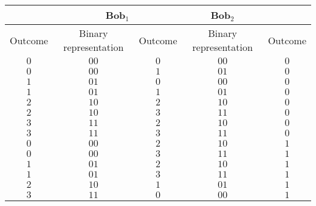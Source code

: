 \documentclass[fleqn,10pt]{wlscirep}
\begin{document}
\begin{table}[h!]
    \centering
    \begin{tabular}{|c|c|c|c|c|}
    \hline
    \rowcolor{lightgray}
       \multicolumn{2}{|c|}{Alice} &\multicolumn{2}{|c|}{Bob$_1$} & Bob$_2$ \\
    \hline
    \rowcolor{lightgray}
      Outcome & Binary representation & Outcome & Binary representation & Outcome \\
    \hline\hline
     $0$ & {\color{blue}$0$}{\color{red}$0$} & $0$ & {\color{blue}$0$}{\color{red}$0$} & {\color{blue}$0$} \\
     \rowcolor{lightgray} $0$ & {\color{blue}$0$}{\color{red}$0$} & $1$ & {\color{blue}$0$}{\color{red}$1$} & {\color{blue}$0$} \\
     $1$ & {\color{blue} $0$}{\color{red}$1$} & $0$ & {\color{blue}$0$}{\color{red}$0$} & {\color{blue}$0$} \\
    \rowcolor{lightgray}  $1$ & {\color{blue} $0$}{\color{red}$1$} & $1$ & {\color{blue}$0$}{\color{red}$1$} & {\color{blue}$0$} \\
     $2$ & {\color{blue}$1$}{\color{red}$0$} & $2$ & {\color{blue}$1$}{\color{red}$0$} & {\color{blue}$0$} \\
    \rowcolor{lightgray}  $2$ & {\color{blue}$1$}{\color{red}$0$} & $3$ & {\color{blue}$1$}{\color{red}$1$} & {\color{blue}$0$} \\
     $3$ & {\color{blue} $1$}{\color{red}$1$} & $2$ & {\color{blue}$1$}{\color{red}$0$} & {\color{blue}$0$} \\
    \rowcolor{lightgray}  $3$ & {\color{blue} $1$}{\color{red}$1$} & $3$ & {\color{blue}$1$}{\color{red}$1$} & {\color{blue}$0$} \\
     \hline
     $0$ & {\color{blue} $0$}{\color{red}$0$} & $2$ & {\color{blue}$1$}{\color{red}$0$} & {\color{blue}$1$} \\
    \rowcolor{lightgray}  $0$ & {\color{blue}$0$}{\color{red}$0$} & $3$ & {\color{blue}$1$}{\color{red}$1$} & {\color{blue}$1$} \\
     $1$ & {\color{blue}$0$}{\color{red}$1$} & $2$ & {\color{blue} $1$}{\color{red}$0$} & {\color{blue}$1$} \\
    \rowcolor{lightgray}  $1$ & {\color{blue}$0$}{\color{red}$1$} & $3$ & {\color{blue}$1$}{\color{red}$1$} & {\color{blue}$1$} \\
     $2$ & {\color{blue} $1$}{\color{red}$0$} & $1$ & {\color{blue}$0$}{\color{red}$1$} & {\color{blue}$1$} \\
    \rowcolor{lightgray}  $3$ & {\color{blue}$1$}{\color{red}$1$} & $0$ & {\color{blue}$0$}{\color{red}$0$} & {\color{blue}$1$} \\

\end{tabular}
\end{table}
\end{document}
